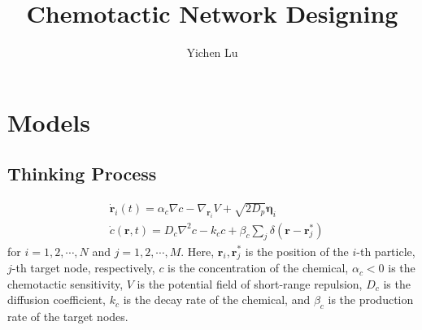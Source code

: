 \documentclass{article}
\title{\textbf{Chemotactic Network Designing}}
\author{Yichen Lu}
\begin{document}
\maketitle

\tableofcontents

\newpage
\section{Models}

\subsection{Thinking Process}

\begin{subequations}
    \begin{align}
        &\dot{\mathbf{r}}_i\left( t \right) =\alpha_c \nabla c-\nabla _{\mathbf{r}_i}V+\sqrt{2D_p}\mathbf{\eta }_i\\
        &\dot{c}\left( \mathbf{r},t \right) =D_c\nabla ^2c-k_cc+\beta _c\sum\nolimits_j^{}{\delta \left( \mathbf{r}-\mathbf{r}_{j}^{*} \right)}
    \end{align}
\end{subequations}
for $i=1,2,\cdots,N$ and $j=1,2,\cdots,M$. Here, $\mathbf{r}_i, \mathbf{r}_j^*$ is the position of the $i$-th particle, $j$-th target node, respectively, $c$ is the concentration of the chemical, $\alpha _c<0$ is the chemotactic sensitivity, $V$ is the potential field of short-range repulsion, $D_c$ is the diffusion coefficient, $k_c$ is the decay rate of the chemical, and $\beta _c$ is the production rate of the target nodes. 
\end{document}
